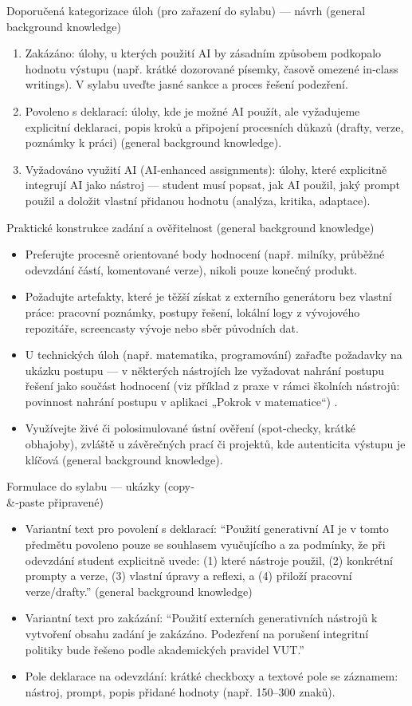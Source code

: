 \documentclass{report}%
\begin{document}
Doporučená kategorizace úloh (pro zařazení do sylabu) — návrh (general background knowledge)
\begin{enumerate}
  \item Zakázáno: úlohy, u kterých použití AI by zásadním způsobem podkopalo hodnotu výstupu (např. krátké dozorované písemky, časově omezené in‑class writings). V sylabu uveďte jasné sankce a proces řešení podezření.
  \item Povoleno s deklarací: úlohy, kde je možné AI použít, ale vyžadujeme explicitní deklaraci, popis kroků a připojení procesních důkazů (drafty, verze, poznámky k práci) (general background knowledge).
  \item Vyžadováno využití AI (AI‑enhanced assignments): úlohy, které explicitně integrují AI jako nástroj — student musí popsat, jak AI použil, jaký prompt použil a doložit vlastní přidanou hodnotu (analýza, kritika, adaptace).
\end{enumerate}

Praktické konstrukce zadání a ověřitelnost (general background knowledge)
\begin{itemize}
  \item Preferujte procesně orientované body hodnocení (např. milníky, průběžné odevzdání částí, komentované verze), nikoli pouze konečný produkt.
  \item Požadujte artefakty, které je těžší získat z externího generátoru bez vlastní práce: pracovní poznámky, postupy řešení, lokální logy z vývojového repozitáře, screencasty vývoje nebo sběr původních dat.
  \item U technických úloh (např. matematika, programování) zařaďte požadavky na ukázku postupu — v některých nástrojích lze vyžadovat nahrání postupu řešení jako součást hodnocení (viz příklad z praxe v rámci školních nástrojů: povinnost nahrání postupu v aplikaci „Pokrok v matematice“) \cite{kb_ai_101_tipu_pdf_04e4a115_page_8_1}.
  \item Využívejte živé či polosimulované ústní ověření (spot‑checky, krátké obhajoby), zvláště u závěrečných prací či projektů, kde autenticita výstupu je klíčová (general background knowledge).
\end{itemize}

Formulace do sylabu — ukázky (copy‑\\ \&‑paste připravené)
\begin{itemize}
  \item Variantní text pro povolení s deklarací: ``Použití generativní AI je v tomto předmětu povoleno pouze se souhlasem vyučujícího a za podmínky, že při odevzdání student explicitně uvede: (1) které nástroje použil, (2) konkrétní prompty a verze, (3) vlastní úpravy a reflexi, a (4) přiloží pracovní verze/drafty.'' (general background knowledge)
  \item Variantní text pro zakázání: ``Použití externích generativních nástrojů k vytvoření obsahu zadání je zakázáno. Podezření na porušení integritní politiky bude řešeno podle akademických pravidel VUT.''
  \item Pole deklarace na odevzdání: krátké checkboxy a textové pole se záznamem: nástroj, prompt, popis přidané hodnoty (např. 150–300 znaků).
\end{itemize}
\end{document}
